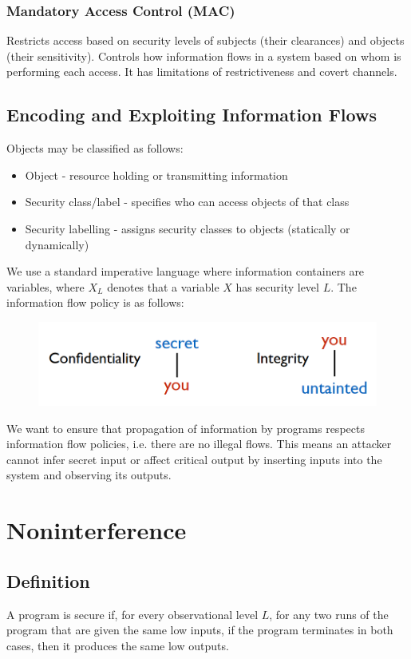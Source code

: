 \documentclass[10pt,a4paper]{report}
\begin{document}
\subsubsection{Mandatory Access Control (MAC)}
Restricts access based on security levels of subjects (their clearances) and objects (their sensitivity). Controls how information flows in a system based on whom is performing each access. It has limitations of restrictiveness and covert channels.
\subsection{Encoding and Exploiting Information Flows}
Objects may be classified as follows:
\begin{itemize}
\item Object - resource holding or transmitting information
\item Security class/label - specifies who can access objects of that class
\item Security labelling - assigns security classes to objects (statically or dynamically)
\end{itemize}
We use a  standard imperative language where information containers are variables, where $X_L$ denotes that a variable $X$ has security level $L$. The information flow policy is as follows:
\begin{figure}[H]
\centering
\includegraphics[scale=0.4]{1.png}
\end{figure}
We want to ensure that propagation of information by programs respects information flow policies, i.e. there are no illegal flows. This means an attacker cannot infer secret input or affect critical output by inserting inputs into the system and observing its outputs.

\section{Noninterference}
\subsection{Definition}
A program is secure if, for every observational level $L$, for any two runs of the program that are given the same low inputs, if the program terminates in both cases, then it produces the same low outputs.
\end{document}
